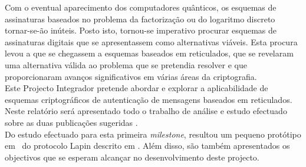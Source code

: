Com o eventual aparecimento dos computadores quânticos, os esquemas de assinaturas baseados no problema da factorização ou do logaritmo discreto tornar-se-ão inúteis. Posto isto, tornou-se imperativo procurar esquemas de assinaturas digitais que se apresentassem como alternativas viáveis. Esta procura levou a que se chegassem a esquemas baseados em reticulados, que se revelaram uma alternativa válida ao problema que se pretendia resolver e que proporcionaram avanços significativos em várias áreas da criptografia. \\
Este Projecto Integrador pretende abordar e explorar a aplicabilidade de esquemas criptográficos de autenticação de mensagens baseados em reticulados. Neste relatório será apresentado todo o trabalho de análise e estudo efectuado sobre as duas publicações sugeridas \cite{lapin,lattice_sig}.\\
Do estudo efectuado para esta primeira \textit{milestone}, resultou um pequeno protótipo em \sage\ do protocolo Lapin descrito em \cite{lapin}. Além disso, são também apresentados os objectivos que se esperam alcançar no desenvolvimento deste projecto.
